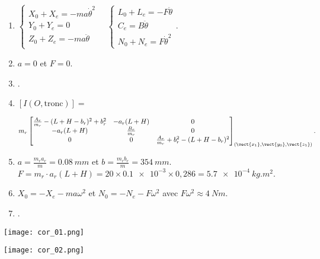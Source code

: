 \begin{multicols}{2}
\begin{enumerate}
\item $
\left\{ \begin{array}{l}
X_0 + X_e = - m a \dot{\theta}^2 \\
Y_0 + Y_e = 0 \\
Z_0 + Z_e = - m a \ddot{\theta} \\
\end{array}
\right.
\quad
\left\{ \begin{array}{l}
L_0 +L_e = -F \ddot{\theta} \\
C_e = B \ddot{\theta} \\
N_0 +N_e= F \dot{\theta}^2
\end{array}
\right. .
$

\item $a=0$ et $F=0$.

\item .%

\item 
$\left[I(O,\text{tronc})\right]=$

$m_r 
\begin{bmatrix}
\frac{A_r}{m_r}-(L+H-b_r)^2+b_r^2 & -a_r(L+H) & 0 \\ 
-a_r(L+H) & \frac{B_r}{m_r} & 0 \\ 
0 & 0 & \frac{A_r}{m_r}+b_r^2-(L+H-b_r)^2
\end{bmatrix}_{(\vect {x_1},\vect{y_0},\vect{z_1})}.$

\item $a=\frac{m_r a_r}{m}=\SI{0.08}{mm}$ et $b=\frac{m_r b_r}{m}=\SI{354}{mm}$.
 $F=m_r\cdot a_r(L+H)=20\times \num{0,1e-3} \times 0,286=\SI{5.7e-4}{kg.m^2}$. 

\item  $X_0=- X_e - m a \omega^2$  et $N_0=-N_e-F \omega^2$ avec $F \omega^2\approx \SI{4}{Nm}$. 

\item .

\end{enumerate}
\end{multicols}

\fi

\ifprof

\begin{center}
\texttt{[image: cor\_01.png]}
\end{center}
\begin{center}
\texttt{[image: cor\_02.png]}
\end{center}

\else
\fi

